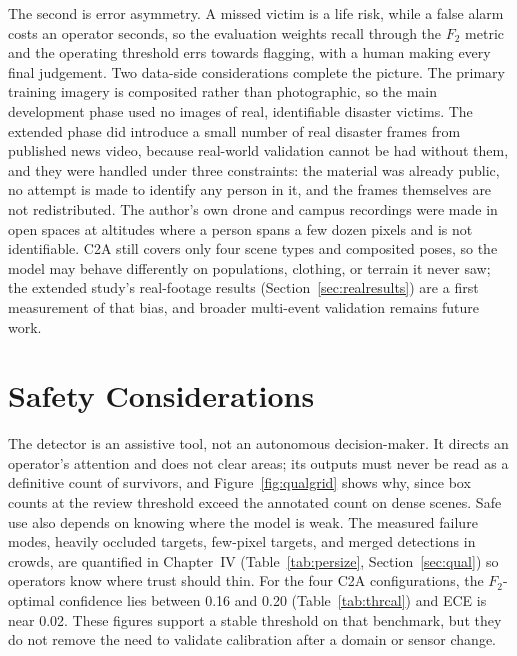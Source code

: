 \documentclass[12pt,a4paper,oneside]{report}
\begin{document}
The second is error asymmetry. A missed victim is a life risk, while a false
alarm costs an operator seconds, so the evaluation weights recall through the
$F_2$ metric and the operating threshold errs towards flagging, with a human
making every final judgement. Two data-side considerations complete the
picture. The primary training imagery is composited rather than photographic,
so the main development phase used no images of real, identifiable disaster
victims. The extended phase did introduce a small number of real disaster
frames from published news video, because real-world validation cannot be had
without them, and they were handled under three constraints: the material was
already public, no attempt is made to identify any person in it, and the
frames themselves are not redistributed. The author's own drone and campus
recordings were made in open spaces at altitudes where a person spans a few
dozen pixels and is not identifiable. C2A still covers only four scene types
and composited poses, so the model may behave differently on populations,
clothing, or terrain it never saw; the extended study's real-footage results
(Section~\ref{sec:realresults}) are a first measurement of that bias, and
broader multi-event validation remains future work.

\section{Safety Considerations}
The detector is an assistive tool, not an autonomous decision-maker. It
directs an operator's attention and does not clear areas; its outputs must
never be read as a definitive count of survivors, and
Figure~\ref{fig:qualgrid} shows why, since box counts at the review threshold
exceed the annotated count on dense scenes. Safe use also depends on knowing
where the model is weak. The measured failure modes, heavily occluded
targets, few-pixel targets, and merged detections in crowds, are quantified
in Chapter~IV (Table~\ref{tab:persize}, Section~\ref{sec:qual}) so operators
know where trust should thin. For the four C2A configurations, the
$F_2$-optimal confidence lies between 0.16 and 0.20
(Table~\ref{tab:thrcal}) and ECE is near 0.02. These figures support a stable
threshold on that benchmark, but they do not remove the need to validate
calibration after a domain or sensor change.
\end{document}
